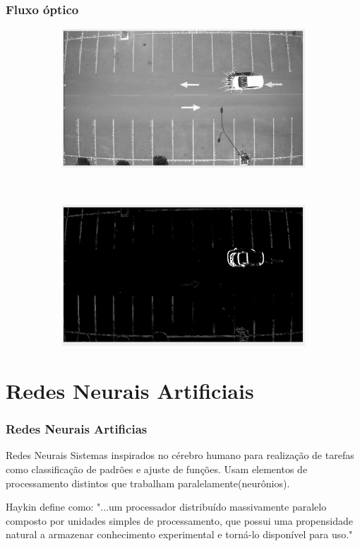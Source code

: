 \documentclass{beamer}
\begin{document}
\begin{frame}
\frametitle{Fluxo óptico}
\begin{figure}
 \centering
\begin{subfigure}{.4\textwidth}
  \centering
  \includegraphics[width=.8\linewidth]{velocidadevetores}
	\caption{}
\end{subfigure}\
\begin{subfigure}{.4\textwidth}
  \centering
  \includegraphics[width=.8\linewidth]{velocidademagnitude}
	\caption{}
\end{subfigure}
\end{figure}
\end{frame}

\section{Redes Neurais Artificiais}

\begin{frame}
\frametitle{Redes Neurais Artificias}
\begin{block}{Redes Neurais}
Sistemas inspirados no cérebro humano para realização de tarefas como classificação de padrões e ajuste de funções. Usam elementos de processamento distintos que trabalham paralelamente(neurônios).
\end{block}

\begin{block}{Haykin define como:}
 "...um processador distribuído massivamente paralelo composto por unidades simples de processamento, que possui uma propensidade natural a armazenar conhecimento experimental e torná-lo disponível para uso."
\end{block}
\end{frame}
\end{document}
